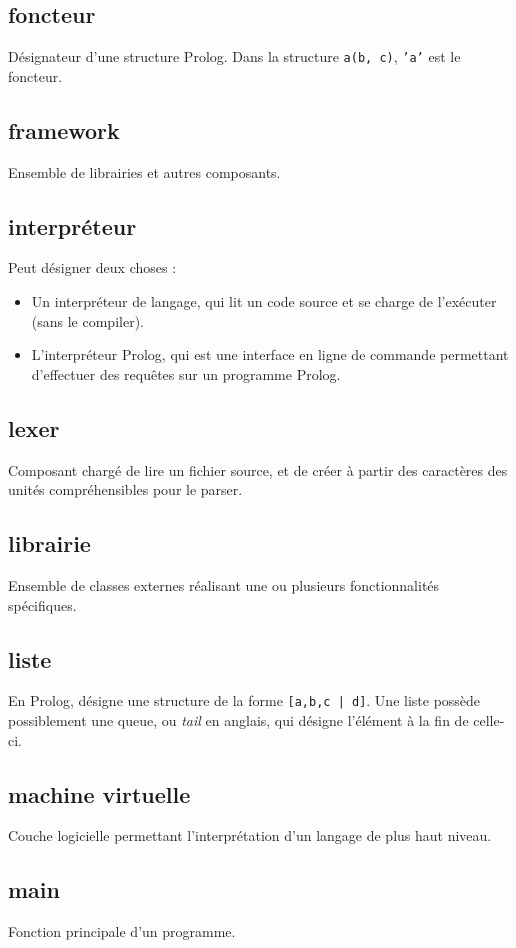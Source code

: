 \documentclass[../report.tex]{subfiles}
\begin{document}
\subsection*{foncteur}
Désignateur d'une structure Prolog. Dans la structure \texttt{a(b, c)}, \texttt{'a'} est le foncteur.
\subsection*{framework}
Ensemble de librairies et autres composants.
\subsection*{interpréteur}
Peut désigner deux choses :
\begin{itemize}
    \item Un interpréteur de langage, qui lit un code source et se charge de l'exécuter (sans le compiler).
    \item L'interpréteur Prolog, qui est une interface en ligne de commande permettant d'effectuer des requêtes sur un programme Prolog.
\end{itemize}
\subsection*{lexer}
Composant chargé de lire un fichier source, et de créer à partir des caractères des unités compréhensibles pour le parser.
\subsection*{librairie}
Ensemble de classes externes réalisant une ou plusieurs fonctionnalités spécifiques.
\subsection*{liste}
En Prolog, désigne une structure de la forme \texttt{[a,b,c | d]}. Une liste possède possiblement une queue, ou \textit{tail} en anglais, qui désigne l'élément à la fin de celle-ci.
\subsection*{machine virtuelle}
Couche logicielle permettant l'interprétation d'un langage de plus haut niveau.
\subsection*{main}
Fonction principale d'un programme.
\end{document}
